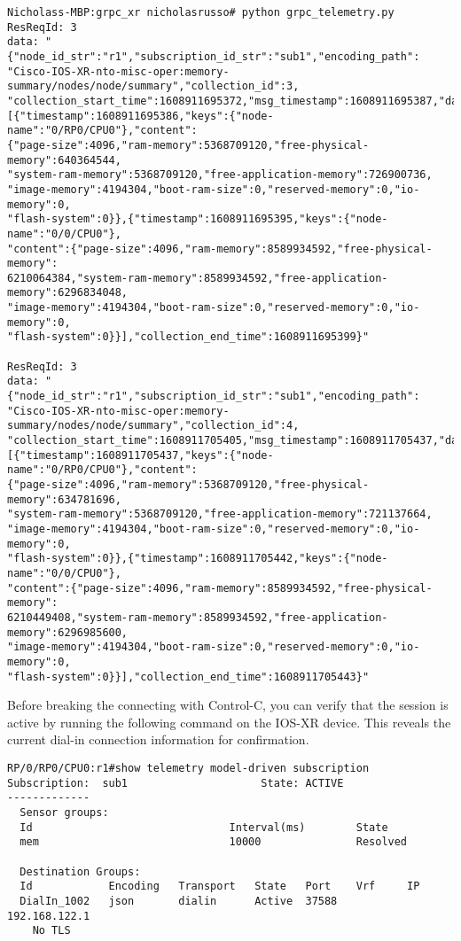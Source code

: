 \begin{verbatim}
Nicholass-MBP:grpc_xr nicholasrusso# python grpc_telemetry.py
ResReqId: 3
data: "{"node_id_str":"r1","subscription_id_str":"sub1","encoding_path":
"Cisco-IOS-XR-nto-misc-oper:memory-summary/nodes/node/summary","collection_id":3,
"collection_start_time":1608911695372,"msg_timestamp":1608911695387,"data_json":
[{"timestamp":1608911695386,"keys":{"node-name":"0/RP0/CPU0"},"content":
{"page-size":4096,"ram-memory":5368709120,"free-physical-memory":640364544,
"system-ram-memory":5368709120,"free-application-memory":726900736,
"image-memory":4194304,"boot-ram-size":0,"reserved-memory":0,"io-memory":0,
"flash-system":0}},{"timestamp":1608911695395,"keys":{"node-name":"0/0/CPU0"},
"content":{"page-size":4096,"ram-memory":8589934592,"free-physical-memory":
6210064384,"system-ram-memory":8589934592,"free-application-memory":6296834048,
"image-memory":4194304,"boot-ram-size":0,"reserved-memory":0,"io-memory":0,
"flash-system":0}}],"collection_end_time":1608911695399}"

ResReqId: 3
data: "{"node_id_str":"r1","subscription_id_str":"sub1","encoding_path":
"Cisco-IOS-XR-nto-misc-oper:memory-summary/nodes/node/summary","collection_id":4,
"collection_start_time":1608911705405,"msg_timestamp":1608911705437,"data_json":
[{"timestamp":1608911705437,"keys":{"node-name":"0/RP0/CPU0"},"content":
{"page-size":4096,"ram-memory":5368709120,"free-physical-memory":634781696,
"system-ram-memory":5368709120,"free-application-memory":721137664,
"image-memory":4194304,"boot-ram-size":0,"reserved-memory":0,"io-memory":0,
"flash-system":0}},{"timestamp":1608911705442,"keys":{"node-name":"0/0/CPU0"},
"content":{"page-size":4096,"ram-memory":8589934592,"free-physical-memory":
6210449408,"system-ram-memory":8589934592,"free-application-memory":6296985600,
"image-memory":4194304,"boot-ram-size":0,"reserved-memory":0,"io-memory":0,
"flash-system":0}}],"collection_end_time":1608911705443}"
\end{verbatim}

Before breaking the connecting with Control-C, you can verify that the
session is active by running the following command on the IOS-XR device.
This reveals the current dial-in connection information for confirmation.

\begin{verbatim}
RP/0/RP0/CPU0:r1#show telemetry model-driven subscription
Subscription:  sub1                     State: ACTIVE
-------------
  Sensor groups:
  Id                               Interval(ms)        State
  mem                              10000               Resolved

  Destination Groups:
  Id            Encoding   Transport   State   Port    Vrf     IP
  DialIn_1002   json       dialin      Active  37588           192.168.122.1
    No TLS
\end{verbatim}

